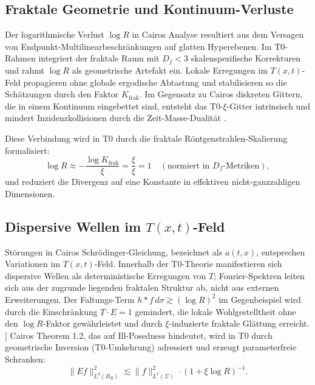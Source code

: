 	\subsection{Fraktale Geometrie und Kontinuum-Verluste}
	
	Der logarithmische Verlust $\log R$ in Cairos Analyse resultiert aus dem Versagen von Endpunkt-Multilinearbeschränkungen auf glatten Hyperebenen. Im T0-Rahmen integriert der fraktale Raum mit $D_f < 3$ skalenspezifische Korrekturen und rahmt $\log R$ als geometrische Artefakt ein. Lokale Erregungen im $T(x,t)$-Feld propagieren ohne globale ergodische Abtastung und stabilisieren so die Schätzungen durch den Faktor $K_\text{frak}$. Im Gegensatz zu Cairos diskreten Gittern, die in einem Kontinuum eingebettet sind, entsteht das T0-$\xi$-Gitter intrinsisch und mindert Inzidenzkollisionen durch die Zeit-Masse-Dualität \cite{T0_netze_en}.
	
	Diese Verbindung wird in T0 durch die fraktale Röntgenstrahlen-Skalierung formalisiert:
	\begin{equation}
		\log R \approx -\frac{\log K_\text{frak}}{\xi} = \frac{\xi}{\xi} = 1 \quad (\text{normiert in } D_f\text{-Metriken}),
	\end{equation}
	und reduziert die Divergenz auf eine Konstante in effektiven nicht-ganzzahligen Dimensionen.
	
	\subsection{Dispersive Wellen im $T(x,t)$-Feld}
	
	Störungen in Cairos Schrödinger-Gleichung, bezeichnet als $a(t,x)$, entsprechen Variationen im $T(x,t)$-Feld. Innerhalb der T0-Theorie manifestieren sich dispersive Wellen als deterministische Erregungen von $T$; Fourier-Spektren leiten sich aus der zugrunde liegenden fraktalen Struktur ab, nicht aus externen Erweiterungen. Der Faltungs-Term $h \ast f \, d\sigma \gtrsim (\log R)^2$ im Gegenbeispiel wird durch die Einschränkung $T \cdot E = 1$ gemindert, die lokale Wohlgestelltheit ohne den $\log R$-Faktor gewährleistet und durch $\xi$-induzierte fraktale Glättung erreicht.
]	
	Cairos Theorem 1.2, das auf Ill-Posedness hindeutet, wird in T0 durch geometrische Inversion (T0-Umkehrung) adressiert und erzeugt parameterfreie Schranken:
	\begin{equation}
		\|Ef\|_{L^2(B_R)}^2 \lesssim \|f\|_{L^2(\Sigma)}^2 \cdot (1 + \xi \log R)^{-1}.
	\end{equation}
	

